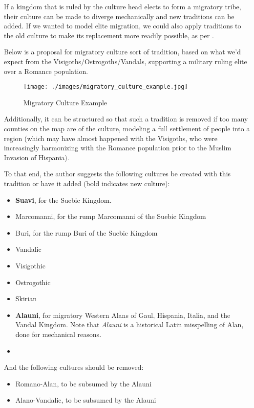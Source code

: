 \documentclass{article}
\begin{document}
	If a kingdom that is ruled by the culture head elects to form a migratory tribe, their culture can be made to diverge mechanically and new traditions can be added.
	If we wanted to model elite migration, we could also apply traditions to the old culture to make its replacement more readily possible, as per \cite{HeatherEmpiresAndBarbarians}.
	
	Below is a proposal for migratory culture sort of tradition, based on what we'd expect from the Visigoths/Ostrogoths/Vandals, supporting a military ruling elite over a Romance population.
	
	\begin{figure}[h!]
		\centering
		\texttt{[image: ./images/migratory\_culture\_example.jpg]}
		\caption{Migratory Culture Example}
	\end{figure}
	
	Additionally, it can be structured so that such a tradition is removed if too many counties on the map are of the culture, modeling a full settlement of people into a region (which may have almost happened with the Visigoths, who were increasingly harmonizing with the Romance population prior to the Muslim Invasion of Hispania).
	
	To that end, the author suggests the following cultures be created with this tradition or have it added (bold indicates new culture):
	\begin{itemize}
		\item \textbf{Suavi}, for the Suebic Kingdom.
		\item Marcomanni, for the rump Marcomanni of the Suebic Kingdom
		\item Buri, for the rump Buri of the Suebic Kingdom
		\item Vandalic
		\item Visigothic
		\item Ostrogothic
		\item Skirian
		\item \textbf{Alauni}, for migratory Western Alans of Gaul, Hispania, Italia, and the Vandal Kingdom.
		Note that \textit{Alauni} is a historical Latin misspelling of Alan, done for mechanical reasons.
		\item 
	\end{itemize}
	
	And the following cultures should be removed:
	\begin{itemize}
		\item Romano-Alan, to be subsumed by the Alauni
		\item Alano-Vandalic, to be subsumed by the Alauni
	\end{itemize}
	
\end{document}
